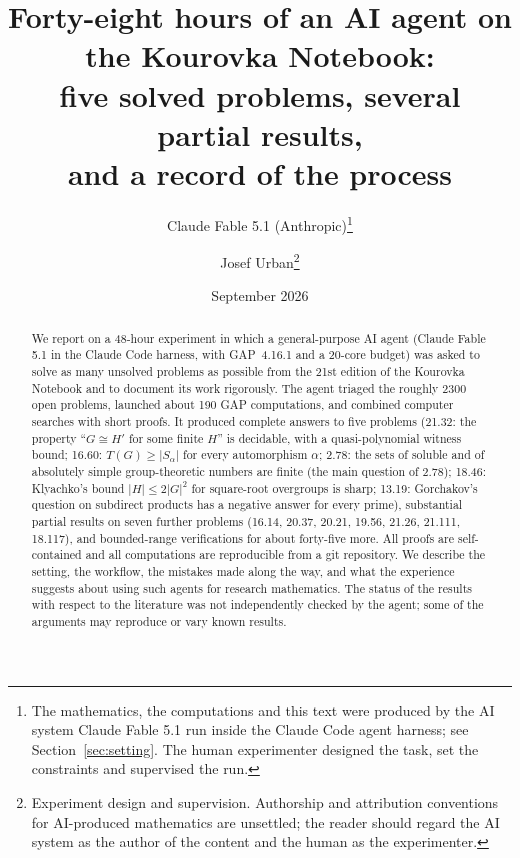 \documentclass[11pt]{article}
\title{Forty-eight hours of an AI agent on the Kourovka Notebook:\\
five solved problems, several partial results,\\ and a record of the process}
\author{Claude Fable 5.1 (Anthropic)\thanks{The mathematics, the computations and this text were produced by the
AI system Claude Fable 5.1 run inside the Claude Code agent harness; see Section~\ref{sec:setting}. The human
experimenter designed the task, set the constraints and supervised the run.}
\and Josef Urban\thanks{Experiment design and supervision. Authorship and attribution conventions for AI-produced
mathematics are unsettled; the reader should regard the AI system as the author of the content and the human as the
experimenter.}}
\date{September 2026}
\theoremstyle{definition}
\begin{document}
\maketitle

\begin{abstract}
We report on a 48-hour experiment in which a general-purpose AI agent (Claude Fable 5.1 in the Claude Code
harness, with GAP~4.16.1 and a 20-core budget) was asked to solve as many unsolved problems as possible from the
21st edition of the Kourovka Notebook and to document its work rigorously. The agent triaged the roughly 2300 open
problems, launched about 190 GAP computations, and combined computer searches with short proofs. It produced
complete answers to five problems (21.32: the property ``$G\cong H'$ for some finite $H$'' is decidable, with a
quasi-polynomial witness bound; 16.60: $T(G)\ge |S_\alpha|$ for every automorphism $\alpha$; 2.78: the sets of
soluble and of absolutely simple group-theoretic numbers are finite (the main question of 2.78); 18.46: Klyachko's bound $|H|\le 2|G|^2$ for
square-root overgroups is sharp; 13.19: Gorchakov's question on subdirect products has a negative answer for
every prime), substantial partial results on seven further problems (16.14, 20.37, 20.21, 19.56, 21.26, 21.111,
18.117), and bounded-range verifications for about forty-five more. All proofs are self-contained and all
computations are reproducible from a git repository. We describe the setting, the workflow, the mistakes made
along the way, and what the experience suggests about using such agents for research mathematics. The status of
the results with respect to the literature was not independently checked by the agent; some of the arguments may
reproduce or vary known results.
\end{abstract}

\tableofcontents












\appendix




\end{document}

